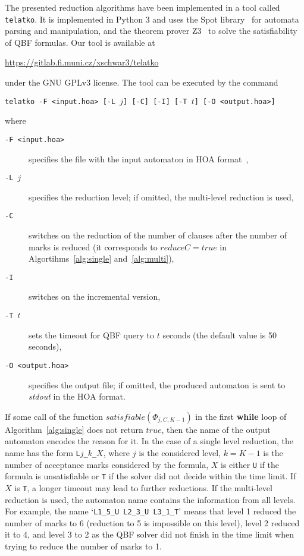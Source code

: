 \documentclass[runningheads]{llncs}
\def\true{\mathit{true}}
\newcommand{\telatko}{\texttt{telatko}\xspace}
\begin{document}
The presented reduction algorithms have been implemented in a tool
called \telatko. It is implemented in Python 3 and uses the Spot
library~\cite{duret.16.atva2} for automata parsing and manipulation,
and the theorem prover Z3~\cite{demoura.08.tacas} to solve the
satisfiability of QBF formulas. Our tool is available at
\begin{center}
\url{https://gitlab.fi.muni.cz/xschwar3/telatko}
\end{center}
under the GNU GPLv3
license. The tool can be executed by the command 
\begin{center}
  \texttt{telatko -F <input.hoa> [-L }$j$\texttt{] [-C] [-I] [-T }$t$\texttt{] [-O <output.hoa>]}
\end{center}
where
\begin{description}
\item[\texttt{-F <input.hoa>}] specifies the file with the input automaton in HOA format~\cite{babiak.15.cav}, 
\item[\texttt{-L }$j$] specifies the reduction level; if omitted, the multi-level reduction is used,
\item[\texttt{-C}] switches on the reduction of the number of clauses
  after the number of marks is reduced (it corresponds to
  $\mathit{reduceC}=\true$ in Algortihms~\ref{alg:single}
  and~\ref{alg:multi}),
\item[\texttt{-I}] switches on the incremental version,
\item[\texttt{-T }$t$] sets the timeout for QBF query to $t$ seconds (the default value is 50 seconds), 
\item[\texttt{-O <output.hoa>}] specifies the output file; if omitted,
  the produced automaton is sent to \textit{stdout} in the HOA format.
\end{description}

If some call of the function
$\mathit{satisfiable}(\Phi_{j,C,K{-}1})$ in the first
\textbf{while} loop of Algorithm~\ref{alg:single} does not return
$\true$, then the name of the output automaton encodes the reason for
it. In the case of a single level reduction, the name has the form
\texttt{L$j$\_$k$\_$X$}, where $j$ is the considered level, $k=K-1$ is
the number of acceptance marks considered by the formula, $X$ is either
\texttt{U} if the formula is unsatisfiable or \texttt{T} if the solver
did not decide within the time limit. If $X$ is \texttt{T}, a longer
timeout may lead to further reductions. If the multi-level reduction
is used, the automaton name contains the information from all
levels. For example, the name `\texttt{L1\_5\_U L2\_3\_U L3\_1\_T}'
means that level 1 reduced the number of marks to 6 (reduction to 5 is
impossible on this level), level 2 reduced it to 4, and level 3 to 2
as the QBF solver did not finish in the time limit when trying to
reduce the number of marks to
1.%
\end{document}

